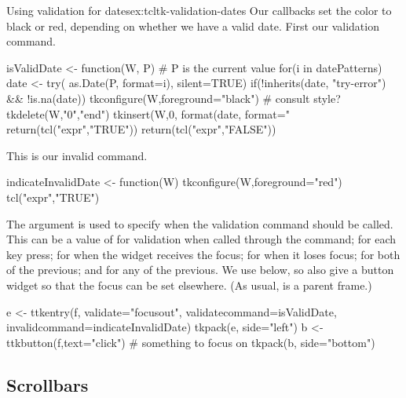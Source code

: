 \begin{example}{Using validation for dates}{ex:tcltk-validation-dates}
Our callbacks set the color to black or red, depending on whether we
have a valid date. First our validation command.
\begin{Schunk}
\begin{Sinput}
 isValidDate <- function(W, P) { # P is the current value
   for(i in datePatterns) {
     date <- try( as.Date(P, format=i), silent=TRUE)
     if(!inherits(date, "try-error") && !is.na(date)) {
       tkconfigure(W,foreground="black") #  consult style?
       tkdelete(W,"0","end")
       tkinsert(W,0, format(date, format="%
       return(tcl("expr","TRUE"))        
     } 
   }
   return(tcl("expr","FALSE"))
 }
\end{Sinput}
\end{Schunk}

This is our invalid command.
\begin{Schunk}
\begin{Sinput}
 indicateInvalidDate <- function(W) {
   tkconfigure(W,foreground="red")
   tcl("expr","TRUE")
 }
\end{Sinput}
\end{Schunk}


The  argument is used to specify when the
validation command should be called. This can be a value of
 for validation when called through the 
command;  for each key press;  for when the
widget receives the focus;  for when it loses focus;
 for both of the previous; and  for any of the
previous. We use  below, so also give a button widget
so that the focus can be set elsewhere. (As usual,  is a
parent frame.)
\begin{Schunk}
\begin{Sinput}
 e <- ttkentry(f, validate="focusout",
               validatecommand=isValidDate,
               invalidcommand=indicateInvalidDate)
 tkpack(e, side="left")
 b <- ttkbutton(f,text="click")          # something to focus on
 tkpack(b, side="bottom")
\end{Sinput}
\end{Schunk}
              
\end{example}

\subsection{Scrollbars}
\label{sec:tcltk:scrollbars}

